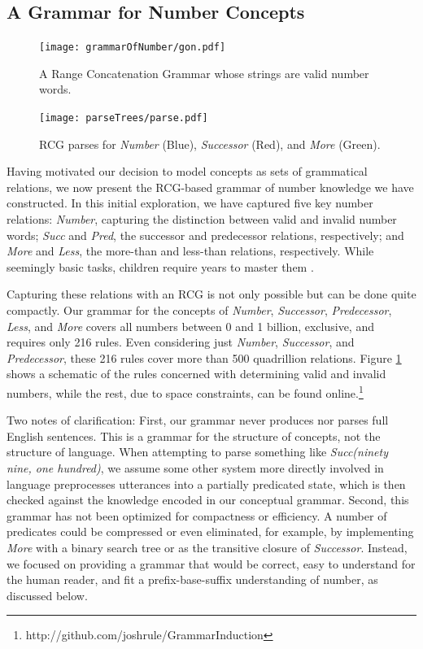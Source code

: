 \documentclass[10pt,letterpaper]{article}
\begin{document}
\subsection{A Grammar for Number Concepts}

\begin{figure}[t]
  \begin{centering}
    \texttt{[image: grammarOfNumber/gon.pdf]}
    \caption{A Range Concatenation Grammar whose strings are valid number words.}
    \label{fig:gon}
  \end{centering}
\end{figure}

\begin{figure}[t]
  \begin{centering}
    \texttt{[image: parseTrees/parse.pdf]}
    \caption{RCG parses for \emph{Number} (Blue), \emph{Successor} (Red), and \emph{More} (Green).}
    \label{fig:parse}
  \end{centering}
\end{figure}

Having motivated our decision to model concepts as sets of grammatical
relations, we now present the RCG-based grammar of number knowledge we
have constructed. In this initial exploration, we have captured five
key number relations: \emph{Number}, capturing the distinction between
valid and invalid number words; \emph{Succ} and \emph{Pred}, the
successor and predecessor relations, respectively; and \emph{More} and
\emph{Less}, the more-than and less-than relations, respectively.
While seemingly basic tasks, children require years to master them
\citep{FusRicBriar1982}.

Capturing these relations with an RCG is not only possible but can
be done quite compactly. Our grammar for the concepts of
\emph{Number}, \emph{Successor}, \emph{Predecessor}, \emph{Less}, and
\emph{More} covers all numbers between 0 and 1 billion, exclusive, and
requires only 216 rules. Even considering just \emph{Number},
\emph{Successor}, and \emph{Predecessor}, these 216 rules cover more
than 500 quadrillion relations. Figure \ref{fig:gon} shows a schematic
of the rules concerned with determining valid and invalid numbers,
while the rest, due to space constraints, can be found
online.\footnote{http://github.com/joshrule/GrammarInduction}

Two notes of clarification: First, our grammar never produces nor
parses full English sentences. This is a grammar for the structure of
concepts, not the structure of language. When attempting to parse
something like \emph{Succ(ninety nine, one hundred)}, we assume some
other system more directly involved in language preprocesses
utterances into a partially predicated state, which is then checked
against the knowledge encoded in our conceptual grammar. Second, this
grammar has not been optimized for compactness or efficiency. A number
of predicates could be compressed or even eliminated, for example, by
implementing \emph{More} with a binary search tree or as the
transitive closure of \emph{Successor}. Instead, we focused on
providing a grammar that would be correct, easy to understand for the
human reader, and fit a prefix-base-suffix understanding of number, as
discussed below.
\end{document}
